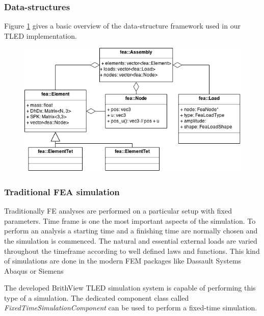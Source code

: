   \subsubsection{Data-structures}

  Figure \ref{fea-cpu-data-structures} gives a basic overview of the data-structure framework used in our TLED implementation.


  \begin{figure}
  \begin{center}
  \includegraphics[width=120mm]{sections/methodology/images/fea/cpu-data-structures.png}
  \caption[Basic overview of TLED implementation in BirthView.]{\label{fea-cpu-data-structures}}
  \end{center}
  \end{figure}



  \subsubsection{Traditional FEA simulation}

  Traditionally FE analyses are performed on a particular setup with fixed parameters. Time frame is one the most important aspects of the simulation. To perform an analysis a starting time and a finishing time are normally chosen and the simulation is commenced. The natural and essential external loads are varied throughout the timeframe according to well defined laws and functions. This kind of simulations are done in the modern FEM packages like Dassault Systems Abaqus or Siemens

  The developed BrithView TLED simulation system is capable of performing this type of a simulation. The dedicated component class called \textit{FixedTimeSimulationComponent} can be used to perform a fixed-time simulation.

